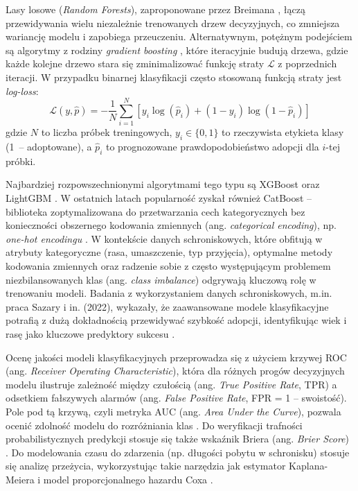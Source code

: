 Lasy losowe (\textit{Random Forests}), zaproponowane przez Breimana \cite{Breiman2001}, łączą przewidywania wielu niezależnie trenowanych drzew decyzyjnych, co zmniejsza wariancję modelu i zapobiega przeuczeniu. Alternatywnym, potężnym podejściem są algorytmy z rodziny \textit{gradient boosting} \cite{Friedman2001}, które iteracyjnie budują drzewa, gdzie każde kolejne drzewo stara się zminimalizować funkcję straty $\mathcal{L}$ z poprzednich iteracji. W przypadku binarnej klasyfikacji często stosowaną funkcją straty jest \textit{log-loss}:
\begin{equation}
\mathcal{L}(y, \hat{p}) = - \frac{1}{N} \sum_{i=1}^{N} \left[ y_i \log(\hat{p}_i) + (1 - y_i) \log(1 - \hat{p}_i) \right]
\end{equation}
gdzie $N$ to liczba próbek treningowych, $y_i \in \{0, 1\}$ to rzeczywista etykieta klasy (1~-- adoptowane), a $\hat{p}_i$ to prognozowane prawdopodobieństwo adopcji dla $i$-tej próbki.


Najbardziej rozpowszechnionymi algorytmami tego typu są XGBoost \cite{Chen2016} oraz LightGBM \cite{Ke2017}. W ostatnich latach popularność zyskał również CatBoost – biblioteka zoptymalizowana do przetwarzania cech kategorycznych bez konieczności obszernego kodowania zmiennych (ang. \textit{categorical encoding}), np. \textit{one-hot encodingu} \cite{Prokhorenkova2018}. W kontekście danych schroniskowych, które obfitują w atrybuty kategoryczne (rasa, umaszczenie, typ przyjęcia), optymalne metody kodowania zmiennych oraz radzenie sobie z często występującym problemem niezbilansowanych klas (ang. \textit{class imbalance}) \cite{He2009} odgrywają kluczową rolę w trenowaniu modeli. Badania z wykorzystaniem danych schroniskowych, m.in. praca Sazary i in. (2022), wykazały, że zaawansowane modele klasyfikacyjne potrafią z dużą dokładnością przewidywać szybkość adopcji, identyfikując wiek i rasę jako kluczowe predyktory sukcesu \cite{Sazara2022}.

Ocenę jakości modeli klasyfikacyjnych przeprowadza się z użyciem krzywej ROC (ang. \emph{Receiver Operating Characteristic}), która dla różnych progów decyzyjnych modelu ilustruje zależność między czułością (ang. \emph{True Positive Rate}, TPR) a odsetkiem fałszywych alarmów (ang. \emph{False Positive Rate}, FPR = 1 -- swoistość). Pole pod tą krzywą, czyli metryka AUC (ang. \emph{Area Under the Curve}), pozwala ocenić zdolność modelu do rozróżniania klas \cite{Fawcett2006}. Do weryfikacji trafności probabilistycznych predykcji stosuje się także wskaźnik Briera (ang. \emph{Brier Score}) \cite{Brier1950}. Do modelowania czasu do zdarzenia (np. długości pobytu w schronisku) stosuje się analizę przeżycia, wykorzystując takie narzędzia jak estymator Kaplana-Meiera \cite{Kaplan1958} i model proporcjonalnego hazardu Coxa \cite{Cox1972}.

